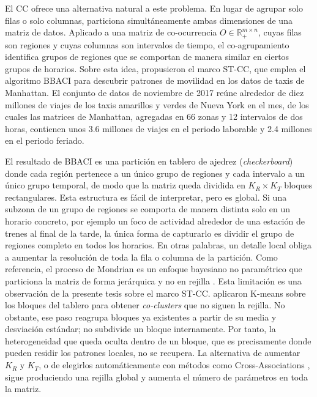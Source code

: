 El \ac{CC} ofrece una alternativa natural a este problema. En lugar de
agrupar solo filas o solo columnas, particiona simultáneamente ambas
dimensiones de una matriz de datos. Aplicado a una matriz de co-ocurrencia
$O \in \mathbb{R}_{+}^{m \times n}$, cuyas filas son regiones y cuyas
columnas son intervalos de tiempo, el co-agrupamiento identifica grupos de
regiones que se comportan de manera similar en ciertos grupos de horarios.
Sobre esta idea, \citet{Liu2021} propusieron el marco \ac{ST-CC}, que emplea
el algoritmo \ac{BBACI} \citep{Banerjee2007} para descubrir patrones de
movilidad en los datos de taxis de Manhattan. El conjunto de datos de
noviembre de 2017 reúne alrededor de diez millones de viajes de los taxis
amarillos y verdes de Nueva York en el mes, de los cuales las matrices de
Manhattan, agregadas en 66 zonas y 12 intervalos de dos horas, contienen
unos 3.6 millones de viajes en el periodo laborable y 2.4 millones en el
periodo feriado.

El resultado de \ac{BBACI} es una partición en tablero de ajedrez
(\emph{checkerboard}) donde cada región pertenece a un único grupo de regiones y
cada intervalo a un único grupo temporal, de modo que la matriz queda
dividida en $K_R \times K_T$ bloques rectangulares. Esta estructura es
fácil de interpretar, pero es global. Si una subzona de un grupo de
regiones se comporta de manera distinta solo en un horario concreto, por
ejemplo un foco de actividad alrededor de una estación de trenes al final
de la tarde, la única forma de capturarlo es dividir el grupo de regiones
completo en todos los horarios. En otras palabras, un detalle local obliga
a aumentar la resolución de toda la fila o columna de la partición. Como
referencia, el proceso de Mondrian es un enfoque bayesiano no paramétrico
que particiona la matriz de forma jerárquica y no en rejilla \citep{Roy2008}.
Esta limitación es una observación de la presente tesis sobre el marco
\ac{ST-CC}. \citet{Liu2021} aplicaron K-means sobre los bloques del tablero
para obtener \emph{co-clusters} que no siguen la rejilla. No obstante, ese paso reagrupa bloques ya
existentes a partir de su media y desviación estándar; no subdivide
un bloque internamente. Por tanto, la heterogeneidad que queda oculta dentro
de un bloque, que es precisamente donde pueden residir los patrones locales,
no se recupera. La alternativa de aumentar $K_R$ y $K_T$, o de elegirlos
automáticamente con métodos como Cross-Associations \citep{Chakrabarti2004},
sigue produciendo una rejilla global y aumenta el número de parámetros en
toda la matriz.

